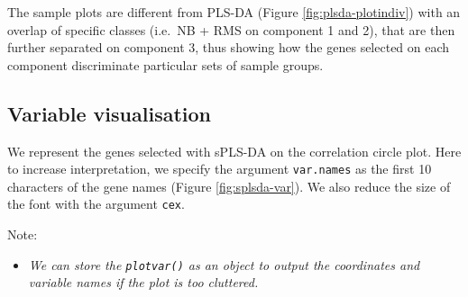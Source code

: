 \documentclass[]{book}
\newenvironment{Shaded}{\begin{snugshade}}{\end{snugshade}}
\newcommand{\KeywordTok}[1]{\textcolor[rgb]{0.13,0.29,0.53}{\textbf{#1}}}
\newcommand{\DataTypeTok}[1]{\textcolor[rgb]{0.13,0.29,0.53}{#1}}
\newcommand{\DecValTok}[1]{\textcolor[rgb]{0.00,0.00,0.81}{#1}}
\newcommand{\StringTok}[1]{\textcolor[rgb]{0.31,0.60,0.02}{#1}}
\newcommand{\OperatorTok}[1]{\textcolor[rgb]{0.81,0.36,0.00}{\textbf{#1}}}
\newcommand{\NormalTok}[1]{#1}
\providecommand{\tightlist}{%
  \setlength{\itemsep}{0pt}\setlength{\parskip}{0pt}}
\begin{document}
The sample plots are different from PLS-DA (Figure
\ref{fig:plsda-plotindiv}) with an overlap of specific classes (i.e.~NB
+ RMS on component 1 and 2), that are then further separated on
component 3, thus showing how the genes selected on each component
discriminate particular sets of sample groups.

\subsection{Variable visualisation}\label{plsda:varplot}

We represent the genes selected with sPLS-DA on the correlation circle
plot. Here to increase interpretation, we specify the argument
\texttt{var.names} as the first 10 characters of the gene names (Figure
\ref{fig:splsda-var}). We also reduce the size of the font with the
argument \texttt{cex}.

Note:

\begin{itemize}
\tightlist
\item
  \emph{We can store the \texttt{plotvar()} as an object to output the
  coordinates and variable names if the plot is too cluttered.}
\end{itemize}

\begin{Shaded}
\end{Shaded}
\end{document}
